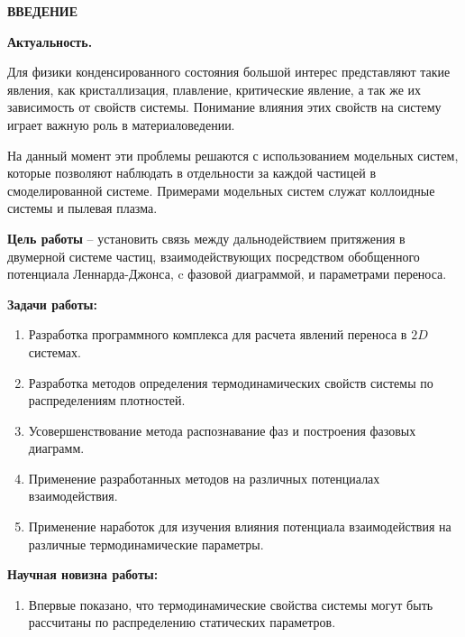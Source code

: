 
\newpage
\begin{center}
\textbf{ВВЕДЕНИЕ}
\end{center}



\textbf{Актуальность.}

Для физики конденсированного состояния большой интерес представляют такие явления, как кристаллизация, плавление, критические явление, а так же их зависимость от свойств системы. Понимание влияния этих свойств на систему играет важную роль в материаловедении.

На данный момент эти проблемы решаются с использованием модельных систем, которые позволяют наблюдать в отдельности за каждой частицей в смоделированной системе. Примерами модельных систем служат коллоидные системы и пылевая плазма.



\textbf{Цель работы} --
установить связь между дальнодействием притяжения в двумерной системе частиц, взаимодействующих посредством обобщенного потенциала Леннарда-Джонса, c фазовой диаграммой, и параметрами переноса.

\textbf{Задачи работы:}
\begin{enumerate}
\item Разработка программного комплекса для расчета явлений переноса в $2D$ системах.
\item Разработка методов определения термодинамических свойств системы по распределениям плотностей. 
\item Усовершенствование метода распознавание фаз и построения фазовых диаграмм.
\item Применение разработанных методов на различных потенциалах взаимодействия.
\item Применение наработок для изучения влияния потенциала взаимодействия на различные термодинамические параметры.
\end{enumerate}

\textbf{Научная новизна работы:}
\begin{enumerate}
\item Впервые показано, что термодинамические свойства системы могут быть рассчитаны по распределению статических параметров.

\end{enumerate}

